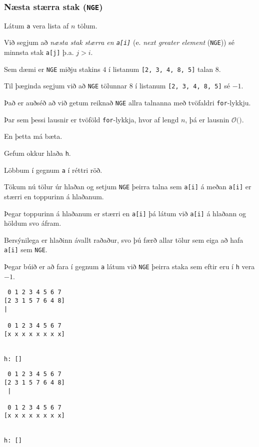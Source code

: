 {
	\frametitle{Næsta stærra stak (\texttt{NGE})}
	{
		\item<1-> Látum \texttt{a} vera lista af $n$ tölum.
		\item<2-> Við segjum að \emph{næsta stak stærra en \texttt{a[i]}} (e. \emph{next greater element} (\texttt{NGE}))
			sé minnsta stak \texttt{a[j]} þ.a. $j > i$.
		\item<3-> Sem dæmi er \texttt{NGE} miðju stakins $4$ í listanum \texttt{[2, 3, 4, 8, 5]} talan $8$.
		\item<4-> Til þæginda segjum við að \texttt{NGE} tölunnar $8$ í listanum \texttt{[2, 3, 4, 8, 5]} sé $-1$.
		\item<5-> Það er auðséð að við getum reiknað \texttt{NGE} allra talnanna með tvöfaldri \texttt{for}-lykkju.
	}
}

{
}

{
	{
		\item<1-> Þar sem þessi lausnir er tvöföld \texttt{for}-lykkja, hvor af lengd $n$, þá er lausnin $\mathcal{O}($\onslide<2->{$n^2$}$)$.
	}
}

{
	{
		\item<1-> En þetta má bæta.
		\item<2-> Gefum okkur hlaða \texttt{h}. 
		\item<3-> Löbbum í gegnum \texttt{a} í réttri röð.
		\item<4-> Tökum nú tölur úr hlaðan og setjum \texttt{NGE} þeirra talna sem \texttt{a[i]} á meðan \texttt{a[i]} er stærri en toppurinn á hlaðanum.
		\item<5-> Þegar toppurinn á hlaðanum er stærri en \texttt{a[i]} þá látum við \texttt{a[i]} á hlaðann og höldum svo áfram.
		\item<6-> Bersýnilega er hlaðinn ávallt raðaður, svo þú færð allar tölur sem eiga að hafa \texttt{a[i]} sem \texttt{NGE}.
		\item<7-> Þegar búið er að fara í gegnum \texttt{a} látum við \texttt{NGE} þeirra staka sem eftir eru í \texttt{h} vera $-1$.
	}
}

{ \begin{verbatim}
 0 1 2 3 4 5 6 7
[2 3 1 5 7 6 4 8]
|

 0 1 2 3 4 5 6 7
[x x x x x x x x]


h: []
\end{verbatim} }

{ \begin{verbatim}
 0 1 2 3 4 5 6 7
[2 3 1 5 7 6 4 8]
 |

 0 1 2 3 4 5 6 7
[x x x x x x x x]


h: []
\end{verbatim} }

